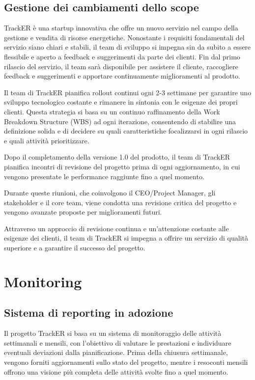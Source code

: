 \documentclass[oneside]{book}
\begin{document}
\section{Gestione dei cambiamenti dello scope}

TrackER è una startup innovativa che offre un nuovo servizio nel campo della gestione e vendita di risorse energetiche. Nonostante i requisiti fondamentali del servizio siano chiari e stabili, il team di sviluppo si impegna sin da subito a essere flessibile e aperto a feedback e suggerimenti da parte dei clienti. Fin dal primo rilascio del servizio, il team sarà disponibile per assistere il cliente, raccogliere feedback e suggerimenti e apportare continuamente miglioramenti al prodotto.

Il team di TrackER pianifica rollout continui ogni 2-3 settimane per garantire uno sviluppo tecnologico costante e rimanere in sintonia con le esigenze dei propri clienti. Questa strategia si basa su un continuo raffinamento della Work Breakdown Structure (WBS) ad ogni iterazione, consentendo di stabilire una definizione solida e di decidere su quali caratteristiche focalizzarsi in ogni rilascio e quali attività prioritizzare.

Dopo il completamento della versione 1.0 del prodotto, il team di TrackER pianifica incontri di revisione del progetto prima di ogni aggiornamento, in cui vengono presentate le performance raggiunte fino a quel momento. 

Durante queste riunioni, che coinvolgono il CEO/Project Manager, gli stakeholder e il core team, viene condotta una revisione critica del progetto e vengono avanzate proposte per miglioramenti futuri.

Attraverso un approccio di revisione continua e un'attenzione costante alle esigenze dei clienti, il team di TrackER si impegna a offrire un servizio di qualità superiore e a garantire il successo del progetto.

\chapter{Monitoring}
\section{Sistema di reporting in adozione}
Il progetto TrackER si basa su un sistema di monitoraggio delle attività settimanali e mensili, con l'obiettivo di valutare le prestazioni e individuare eventuali deviazioni dalla pianificazione. Prima della chiusura settimanale, vengono forniti aggiornamenti sullo stato del progetto, mentre i resoconti mensili offrono una visione più completa delle attività svolte fino a quel momento.
\end{document}
